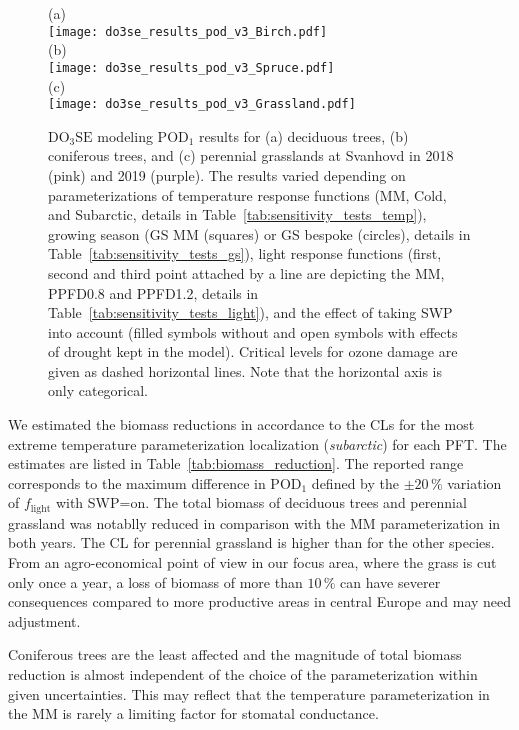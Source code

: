 \documentclass[bg, manuscript]{copernicus}
\begin{document}
\begin{figure}[t]
  \centering
  (a)\\
  \texttt{[image: do3se\_results\_pod\_v3\_Birch.pdf]}\\
  (b)\\
  \texttt{[image: do3se\_results\_pod\_v3\_Spruce.pdf]}\\
  (c)\\
  \texttt{[image: do3se\_results\_pod\_v3\_Grassland.pdf]}
  \caption{$\mathrm{DO_3SE}$ modeling $\mathrm{POD_1}$ results for (a) deciduous trees, (b) coniferous trees, and (c) perennial grasslands at Svanhovd in 2018 (pink) and 2019 (purple). The results varied depending on parameterizations of temperature response functions (MM, Cold, and Subarctic, details in Table~\ref{tab:sensitivity_tests_temp}), growing season (GS MM (squares) or GS bespoke (circles), details in Table~\ref{tab:sensitivity_tests_gs}), light response functions (first, second and third point attached by a line are depicting the MM, PPFD0.8 and PPFD1.2, details in Table~\ref{tab:sensitivity_tests_light}), and the effect of taking SWP into account (filled symbols without and open symbols with effects of drought kept in the model). Critical levels for ozone damage \citep{ICP:MappingManual2017,ESPR:Hayes2021} are given as dashed horizontal lines. Note that the horizontal axis is only categorical.}
  \label{fig:pody_rel}
\end{figure}

We estimated the biomass reductions in accordance to the CLs \citep{ICP:MappingManual2017, ESPR:Hayes2021} for the most extreme temperature parameterization localization (\emph{subarctic}) for each PFT. The estimates are listed in Table~\ref{tab:biomass_reduction}. The reported range corresponds to the maximum difference in $\mathrm{POD_1}$ defined by the $\pm 20\,\unit{\%}$ variation of $f_\mathrm{light}$ with SWP=on. The total biomass of deciduous trees and perennial grassland was notablly reduced in comparison with the MM parameterization in both years. The CL for perennial grassland is higher than for the other species. From an agro-economical point of view in our focus area, where the grass is cut only once a year, a loss of biomass of more than $10\,\unit{\%}$ can have severer consequences compared to more productive areas in central Europe and may need adjustment.

Coniferous trees are the least affected and the magnitude of total biomass reduction is almost independent of the choice of the parameterization within given uncertainties. This may reflect that the temperature parameterization in the MM is rarely a limiting factor for stomatal conductance.
\end{document}
